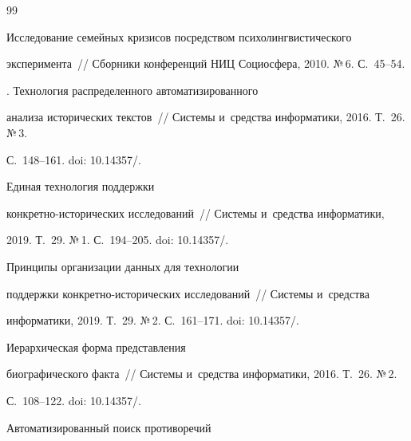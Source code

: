 {\small\frenchspacing


{%




\begin{thebibliography}{99}




   Исследование семейных кризисов посредством психолингвистического 


эксперимента~/\!\!/ Сборники конференций НИЦ Социосфера, 2010. №\,6. С.~45--54.




  . Технология распределенного автоматизированного 


анализа исторических текстов~/\!\!/ Сис\-те\-мы и~средства информатики, 2016. Т.~26. №\,3. 


С.~148--161. doi: 10.14357\!/.




   Единая технология поддержки  


кон\-крет\-но-ис\-то\-ри\-че\-ских исследований~/\!\!/ Сис\-те\-мы и~средства информатики, 


2019. Т.~29. №\,1. С.~194--205. doi: 10.14357\!/.


  




   Принципы организации данных для технологии 


поддержки кон\-крет\-но-ис\-то\-ри\-че\-ских исследований~/\!\!/ Сис\-те\-мы и~средства 


информатики, 2019. Т.~29. №\,2. С.~161--171. doi: 10.14357\!/.


  




   Иерархическая форма представления 


биографического факта~/\!\!/ Системы и~средства информатики, 2016. Т.~26. №\,2.  


С.~108--122. doi: 10.14357\!/.




   Автоматизированный поиск противоречий  



\end{thebibliography}}}
